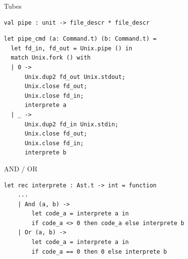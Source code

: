 \begin{frame}[fragile]{Tubes}

\begin{lstlisting}
val pipe : unit -> file_descr * file_descr
\end{lstlisting}

\begin{lstlisting}
let pipe_cmd (a: Command.t) (b: Command.t) =
  let fd_in, fd_out = Unix.pipe () in
  match Unix.fork () with
  | 0 ->
      Unix.dup2 fd_out Unix.stdout;
      Unix.close fd_out;
      Unix.close fd_in;
      interprete a
  | _ ->
      Unix.dup2 fd_in Unix.stdin;
      Unix.close fd_out;
      Unix.close fd_in;
      interprete b
\end{lstlisting}

\end{frame}

\begin{frame}[fragile]{AND / OR}
    
\begin{lstlisting}
let rec interprete : Ast.t -> int = function
    ...
    | And (a, b) ->
        let code_a = interprete a in
        if code_a <> 0 then code_a else interprete b
    | Or (a, b) ->
        let code_a = interprete a in
        if code_a == 0 then 0 else interprete b
\end{lstlisting}
    
\end{frame}